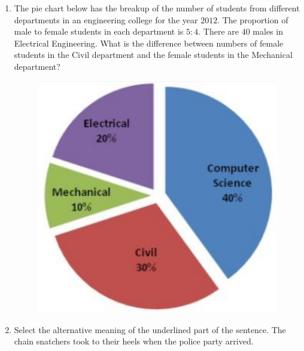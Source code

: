 \documentclass[journal,12pt,onecolumn]{IEEEtran}
\theoremstyle{remark}
\begin{document}
		\vspace{0.7cm}
		\vspace{0.7cm}
	\begin{enumerate}[resume]
		
		\item The pie chart below has the breakup of the number of students from different departments in an engineering college for the year $2012$. The proportion of male to female students in each department is $5\colon4$. There are $40$ males in Electrical Engineering. What is the difference between numbers of female students in the Civil department and the female students in the Mechanical department?
		
\begin{figure}[H]
	\centering
	\includegraphics[width=0.5\linewidth]{figs/screenshot001}
	\caption{}
	\label{fig:screenshot001}
\end{figure}
	
		
		\hfill{}
		
		\item Select the alternative meaning of the underlined part of the sentence.
		The chain snatchers took to their heels when the police party arrived.
		
		\hfill{}
		
		\begin{enumerate}
		\end{enumerate}
		

\end{enumerate}
\end{document}
